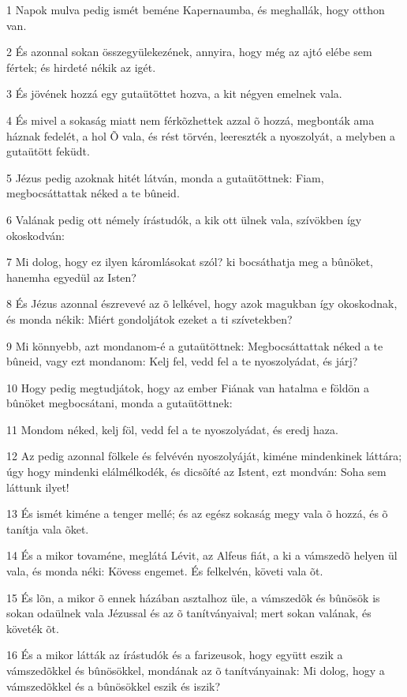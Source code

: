 \par 1 Napok mulva pedig ismét beméne Kapernaumba, és meghallák, hogy otthon van.
\par 2 És azonnal sokan összegyülekezének, annyira, hogy még az ajtó elébe sem fértek; és hirdeté nékik az igét.
\par 3 És jövének hozzá egy gutaütöttet hozva, a kit négyen emelnek vala.
\par 4 És mivel a sokaság miatt nem férkõzhettek azzal õ hozzá, megbonták ama háznak fedelét, a hol Õ vala, és rést törvén, leereszték a nyoszolyát, a melyben a gutaütött feküdt.
\par 5 Jézus pedig azoknak hitét látván, monda a gutaütöttnek: Fiam, megbocsáttattak néked a te bûneid.
\par 6 Valának pedig ott némely írástudók, a kik ott ülnek vala, szívökben így okoskodván:
\par 7 Mi dolog, hogy ez ilyen káromlásokat szól? ki bocsáthatja meg a bûnöket, hanemha egyedül az Isten?
\par 8 És Jézus azonnal észrevevé az õ lelkével, hogy azok magukban így okoskodnak, és monda nékik: Miért gondoljátok ezeket a ti szívetekben?
\par 9 Mi könnyebb, azt mondanom-é a gutaütöttnek: Megbocsáttattak néked a te bûneid, vagy ezt mondanom: Kelj fel, vedd fel a te nyoszolyádat, és járj?
\par 10 Hogy pedig megtudjátok, hogy az ember Fiának van hatalma e földön a bûnöket megbocsátani, monda a gutaütöttnek:
\par 11 Mondom néked, kelj föl, vedd fel a te nyoszolyádat, és eredj haza.
\par 12 Az pedig azonnal fölkele és felvévén nyoszolyáját, kiméne mindenkinek láttára; úgy hogy mindenki elálmélkodék, és dicsõíté az Istent, ezt mondván: Soha sem láttunk ilyet!
\par 13 És ismét kiméne a tenger mellé; és az egész sokaság megy vala õ hozzá, és õ tanítja vala õket.
\par 14 És a mikor tovaméne, meglátá Lévit, az Alfeus fiát, a ki a vámszedõ helyen ül vala, és monda néki: Kövess engemet. És felkelvén, követi vala õt.
\par 15 És lõn, a mikor õ ennek házában asztalhoz üle, a vámszedõk és bûnösök is sokan odaülnek vala Jézussal és az õ tanítványaival; mert sokan valának, és követék õt.
\par 16 És a mikor látták az írástudók és a farizeusok, hogy együtt eszik a vámszedõkkel és bûnösökkel, mondának az õ tanítványainak: Mi dolog, hogy a vámszedõkkel és a bûnösökkel eszik és iszik?
